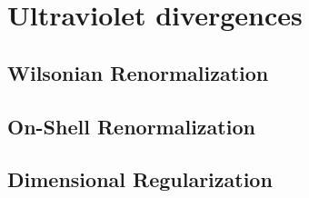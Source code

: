 \chapter{Ultraviolet divergences}

\section{Wilsonian Renormalization}

\section{On-Shell Renormalization}

\section{Dimensional Regularization}